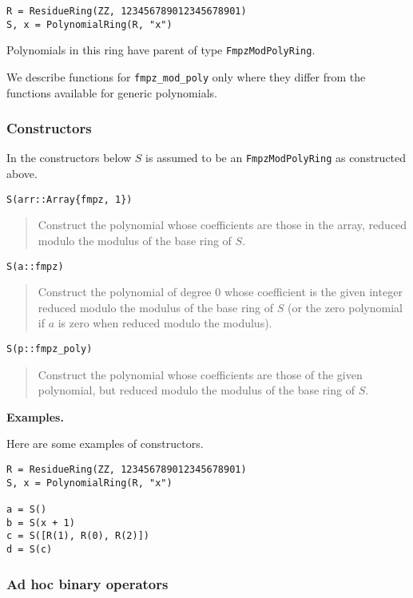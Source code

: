 \documentclass[a4paper,10pt]{article}
\newcommand{\code}{\lstinline}
\newcommand{\desc}[1]{\vspace{-3mm}\begin{quote}#1\end{quote}}
\begin{document}
{{\begin{lstlisting}
R = ResidueRing(ZZ, 123456789012345678901)
S, x = PolynomialRing(R, "x")
\end{lstlisting}

Polynomials in this ring have parent of type \code{FmpzModPolyRing}.

We describe functions for \code{fmpz_mod_poly} only where they differ from the functions
available for generic polynomials.

\subsubsection{Constructors}

In the constructors below $S$ is assumed to be an \code{FmpzModPolyRing} as constructed above.

\begin{lstlisting}
S(arr::Array{fmpz, 1})
\end{lstlisting}

\desc{Construct the polynomial whose coefficients are those in the array, reduced modulo the
modulus of the base ring of $S$.}

\begin{lstlisting}
S(a::fmpz)
\end{lstlisting}

\desc{Construct the polynomial of degree $0$ whose coefficient is the given integer reduced
modulo the modulus of the base ring of $S$ (or the zero polynomial if $a$ is zero when
reduced modulo the modulus).}

\begin{lstlisting}
S(p::fmpz_poly)
\end{lstlisting}

\desc{Construct the polynomial whose coefficients are those of the given polynomial, but
reduced modulo the modulus of the base ring of $S$.}

\textbf{Examples.}

Here are some examples of constructors.

\begin{lstlisting}
R = ResidueRing(ZZ, 123456789012345678901)
S, x = PolynomialRing(R, "x")

a = S()
b = S(x + 1)
c = S([R(1), R(0), R(2)])
d = S(c)
\end{lstlisting}

\subsubsection{Ad hoc binary operators}

}}
\end{document}
